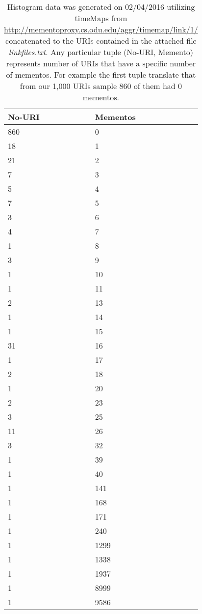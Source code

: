 \newpage
\begin{table}[!htbp]
\caption{Histogram Memento Data for 1000 URIs Extracted from Twitter} \label{tab:table1}

\begin{center}
\begin{tabular}{|l | l|}
\hline
No-URI & Mementos\\
\hline
860 &  0\\
18  &  1\\
21  &  2\\
7   &  3\\
5   &  4\\
7   &  5\\
3   &  6\\
4   &  7\\
1   &  8\\
3   &  9\\
1   & 10\\
1   & 11\\
2   & 13\\
1   & 14\\
1   & 15\\
31  & 16\\
1   & 17\\
2   & 18\\
1   & 20\\
2   & 23\\
3   & 25\\
11  & 26\\
3   & 32\\
1   & 39\\
1   & 40\\
1   & 141\\
1   & 168\\
1   & 171\\
1   & 240\\
1   & 1299\\
1   & 1338\\
1   & 1937\\
1   & 8999\\
1   & 9586\\
\hline
\end{tabular}
\end{center}
\caption*{\scriptsize Histogram data was generated on 02/04/2016 utilizing timeMaps from \url{http://mementoproxy.cs.odu.edu/aggr/timemap/link/1/} concatenated to the URIs contained in the attached file \textit{linkfiles.txt}. Any particular tuple (No-URI, Memento) represents number of URIs that have a specific number of mementos. For example the first tuple translate that from our 1,000 URIs sample 860 of them had 0 mementos. }
\end{table}
